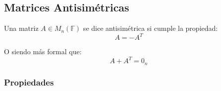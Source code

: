 \documentclass[12pt, fleqn]{report}                             %
\begin{document}
            \clearpage
            \subsection{Matrices Antisimétricas}

                Una matriz $A \in M_{n}(\mathbb{F})$ se dice antisimétrica si cumple la propiedad:
                \begin{equation}
                    A = -A^T
                \end{equation}

                O siendo más formal que:
                \begin{equation}
                    A + A^T = 0_{n}
                \end{equation}

                \subsubsection{Propiedades}
\end{document}
